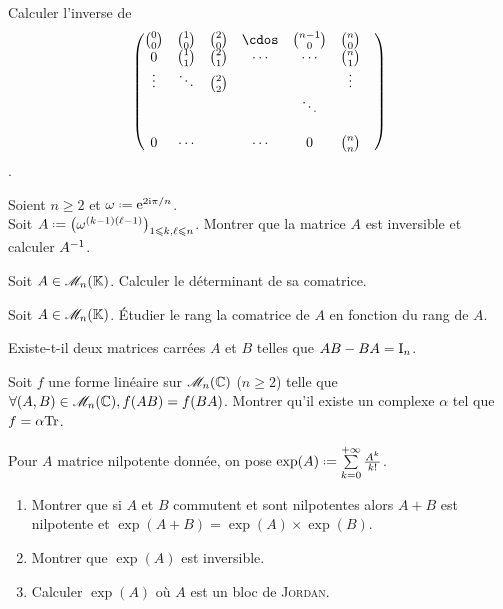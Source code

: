 \begin{exercice}
    Calculer l'inverse de 
    $$
    \begin{pmatrix}
        \binom{0}{0} & \binom{1}{0} & \binom{2}{0} & \cdos & \binom{n-1}{0} & \binom{n}{0} \\
        0 & \binom{1}{1} & \binom{2}{1} & \cdots & \cdots & \binom{n}{1} \\
        \vdots & \ddots & \binom{2}{2} & & & \vdots \\
        & & & & \ddots & & \\
        & & & & & & \\
        0 & \cdots & & \cdots & 0 & \binom{n}{n}
    \end{pmatrix}
    $$.
\end{exercice}

\begin{exercice}
    Soient $n \geqslant 2$ et $\omega \defeq \me^{2 \mi \pi / n}$. \\
    Soit $A \defeq \big( \omega^{(k-1)(\ell-1)} \big)_{1 \leqslant k, \ell \leqslant n}$. Montrer que la matrice $A$ est inversible et calculer $A^{-1}$.
\end{exercice}

\begin{exercice}
    Soit $A \in \mathscr{M}_n(\mathbb{K})$. Calculer le déterminant de sa comatrice. 
\end{exercice}

\begin{exercice}
    Soit $A \in \mathscr{M}_n(\mathbb{K})$. Étudier le rang la comatrice de $A$ en fonction du rang de $A$.
\end{exercice}

\begin{exercice}
    Existe-t-il deux matrices carrées $A$ et $B$ telles que $AB-BA = \mathrm{I}_n$.
\end{exercice}

\begin{exercice}
    Soit $f$ une forme linéaire sur $\mathscr{M}_n(\mathbb{C})$ ($n\geqslant2$) telle que $\forall (A, B) \in \mathscr{M}_n(\mathbb{C}), f(AB) = f(BA)$. Montrer qu'il existe un complexe $\alpha$ tel que $f = \alpha \mathrm{Tr}$.
\end{exercice}

\begin{exercice}
    Pour $A$ matrice nilpotente donnée, on pose $\exp(A) \defeq \sum\limits_{k=0}^{+\infty} \frac{A^k}{k!}$.
    \begin{enumerate}
        \item Montrer que si $A$ et $B$ commutent et sont nilpotentes alors $A+B$ est nilpotente et $\exp(A+B) = \exp(A) \times \exp(B)$.
        \item Montrer que $\exp(A)$ est inversible.
        \item Calculer $\exp(A)$ où $A$ est un bloc de \textsc{Jordan}.
    \end{enumerate}
\end{exercice}

